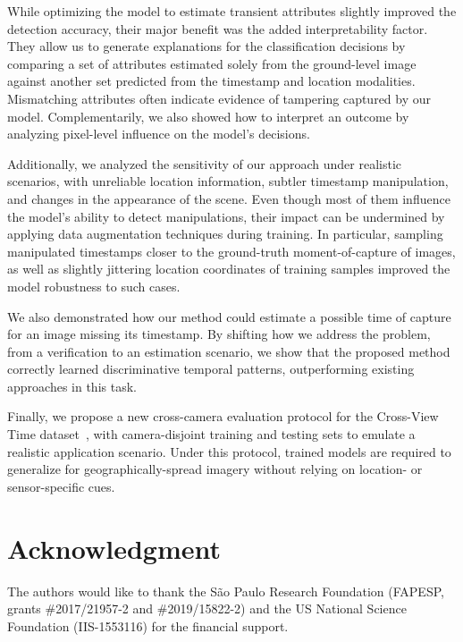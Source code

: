 \documentclass[journal]{IEEEtran}
\begin{document}
    While optimizing the model to estimate transient attributes slightly improved the detection accuracy, their major benefit was the added interpretability factor. They allow us to generate explanations for the classification decisions by comparing a set of attributes estimated solely from the ground-level image against another set predicted from the timestamp and location modalities. Mismatching attributes often indicate evidence of tampering captured by our model. Complementarily, we also showed how to interpret an outcome by analyzing pixel-level influence on the model's decisions.
    
    Additionally, we analyzed the sensitivity of our approach under realistic scenarios, with unreliable location information, subtler timestamp manipulation, and changes in the appearance of the scene. Even though most of them influence the model's ability to detect manipulations, their impact can be undermined by applying data augmentation techniques during training. In particular, sampling manipulated timestamps closer to the ground-truth moment-of-capture of images, as well as slightly jittering location coordinates of training samples improved the model robustness to such cases.
    
    We also demonstrated how our method could estimate a possible time of capture for an image missing its timestamp. By shifting how we address the problem, from a verification to an estimation scenario, we show that the proposed method correctly learned discriminative temporal patterns, outperforming existing approaches in this task.
    
    Finally, we propose a new cross-camera evaluation protocol for the Cross-View Time dataset~\cite{salem2020learning}, with camera-disjoint training and testing sets to emulate a realistic application scenario. Under this protocol, trained models are required to generalize for geographically-spread imagery without relying on location- or sensor-specific cues.
    

\section*{Acknowledgment}
    The authors would like to thank the São Paulo Research Foundation (FAPESP, grants \#2017/21957-2 and \#2019/15822-2) and the US National
Science Foundation (IIS-1553116) for the financial support.





\end{document}
